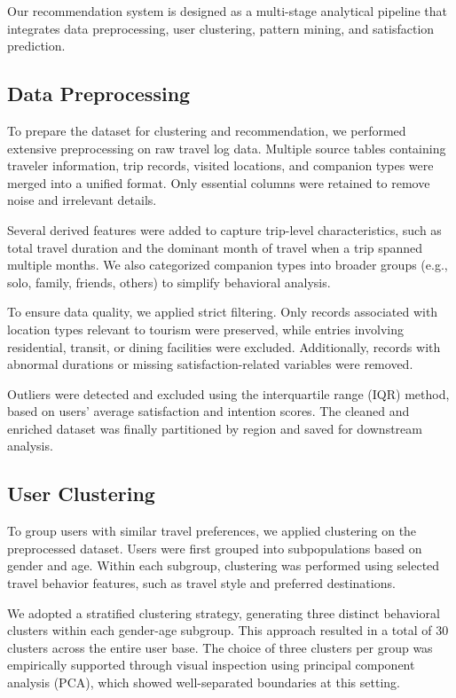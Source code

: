 \documentclass[sigconf]{acmart}
\begin{document}
Our recommendation system is designed as a multi-stage analytical pipeline that integrates data preprocessing, user clustering, pattern mining, and satisfaction prediction.

\subsection{Data Preprocessing}

To prepare the dataset for clustering and recommendation, we performed extensive preprocessing on raw travel log data. Multiple source tables containing traveler information, trip records, visited locations, and companion types were merged into a unified format. Only essential columns were retained to remove noise and irrelevant details.

Several derived features were added to capture trip-level characteristics, such as total travel duration and the dominant month of travel when a trip spanned multiple months. We also categorized companion types into broader groups (e.g., solo, family, friends, others) to simplify behavioral analysis.

To ensure data quality, we applied strict filtering. Only records associated with location types relevant to tourism were preserved, while entries involving residential, transit, or dining facilities were excluded. Additionally, records with abnormal durations or missing satisfaction-related variables were removed.

Outliers were detected and excluded using the interquartile range (IQR) method, based on users’ average satisfaction and intention scores. The cleaned and enriched dataset was finally partitioned by region and saved for downstream analysis.


\subsection{User Clustering}

To group users with similar travel preferences, we applied clustering on the preprocessed dataset. Users were first grouped into subpopulations based on gender and age. Within each subgroup, clustering was performed using selected travel behavior features, such as travel style and preferred destinations.

We adopted a stratified clustering strategy, generating three distinct behavioral clusters within each gender-age subgroup. This approach resulted in a total of 30 clusters across the entire user base. The choice of three clusters per group was empirically supported through visual inspection using principal component analysis (PCA), which showed well-separated boundaries at this setting.
\end{document}

